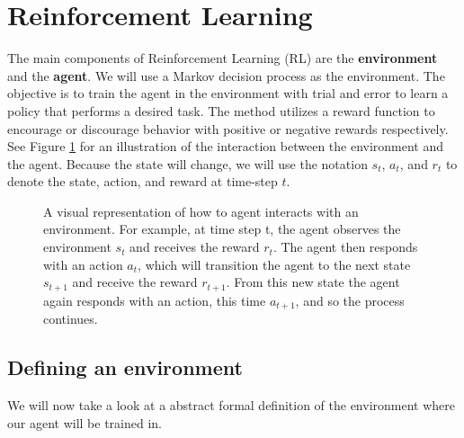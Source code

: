 \documentclass[12pt,A4]{report}
\theoremstyle{definition}
\newtheorem{definition}{Definition}[section]
\begin{document}
\section{Reinforcement Learning}
The main components of Reinforcement Learning (RL) are the \textbf{environment} and the \textbf{agent}. We will use a Markov decision process as the environment. The objective is to train the agent in the environment with trial and error to learn a policy that performs a desired task. The method utilizes a reward function to encourage or discourage behavior with positive or negative rewards respectively. See Figure \ref{fig:RL} for an illustration of the interaction between the environment and the agent. Because the state will change, we will use the notation $s_t$, $a_t$, and $r_t$ to denote the state, action, and reward at time-step $t$.


\begin{figure}[H]
  
  \caption{A visual representation of how to agent interacts with an environment. For example, at time step t, the agent observes the environment $s_t$ and receives the reward $r_t$. The agent then responds with an action $a_t$, which will transition the agent to the next state $s_{t+1}$ and receive the reward $r_{t+1}$. From this new state the agent again responds with an action, this time $a_{t+1}$, and so the process continues. } 
  \label{fig:RL}
\end{figure} 
 

\subsection{Defining an environment}
We will now take a look at a abstract formal definition of the environment where our agent will be trained in.
\end{document}

